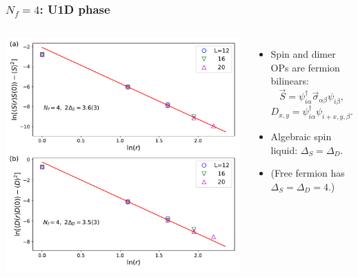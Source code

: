\documentclass[xcolor=table, 10pt, aspectratio=43]{beamer}
\begin{document}
\begin{frame}
  \frametitle{$N_f=4$: U1D phase}
  \begin{columns}
    \includegraphics[width=\textwidth]{../u1sl/n4decay}
		\begin{itemize}
			\item Spin and dimer OPs are fermion bilinears:
			\[\vec S = \psi^\dagger_{i\alpha}\vec\sigma_{\alpha\beta}\psi_{i\beta},\]
			\[D_{x,y} = \psi^\dagger_{i\alpha}\psi_{i+x,y,\beta}.\]
			\item Algebraic spin liquid: $\Delta_S = \Delta_D$.
		  \item (Free fermion has $\Delta_S=\Delta_D = 4$.)
		\end{itemize}
  \end{columns}
\end{frame}
\end{document}
